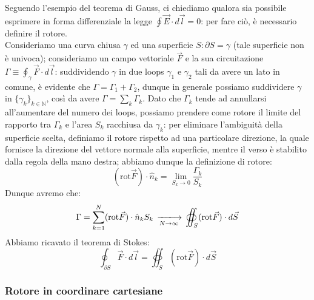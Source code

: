 Seguendo l'esempio del teorema di Gauss, ci chiediamo qualora sia possibile esprimere in forma differenziale la legge $ \oint \vec{E} \cdot d\vec{l} = 0 $: per fare ciò, è necessario definire il rotore. \\
%
Consideriamo una curva chiusa $ \gamma $ ed una superficie $ S : \partial S = \gamma $ (tale superficie non è univoca); consideriamo un campo vettoriale $ \vec{F} $ e la sua circuitazione $ \Gamma \equiv \oint_{\gamma} \vec{F} \cdot d\vec{l} $: suddividendo $ \gamma $ in due loops $ \gamma_1 $ e $ \gamma_2 $ tali da avere un lato in comune, è evidente che $ \Gamma = \Gamma_1 + \Gamma_2 $, dunque in generale possiamo suddividere $ \gamma $ in $ \{\gamma_k\}_{k\in\mathbb{N}} $, così da avere $ \Gamma = \sum_{k} \Gamma_k $. Dato che $ \Gamma_k $ tende ad annullarsi all'aumentare del numero dei loops, possiamo prendere come rotore il limite del rapporto tra $ \Gamma_k $ e l'area $ S_k $ racchiusa da $ \gamma_k $: per eliminare l'ambiguità della superficie scelta, definiamo il rotore rispetto ad una particolare direzione, la quale fornisce la direzione del vettore normale alla superficie, mentre il verso è stabilito dalla regola della mano destra; abbiamo dunque la definizione di rotore:
\begin{equation}
	( \text{rot} \vec{F} ) \cdot \hat{n}_k = \lim_{S_k \rightarrow 0} \frac{\Gamma_k}{S_k}
	\label{eq:}
\end{equation}
Dunque avremo che:
\begin{equation}
	\Gamma = \displaystyle\sum_{k = 1}^{N} ( \text{rot} \vec{F} ) \cdot \hat{n}_k S_k \,\xlongrightarrow[N \rightarrow \infty]{}\, \oiint_S ( \text{rot} \vec{F} ) \cdot d\vec{S}
	\label{eq:}
\end{equation}
Abbiamo ricavato il teorema di Stokes:
\begin{equation}
	\oint_{\partial S} \vec{F} \cdot d\vec{l} = \oiint_S ( \text{rot} \vec{F} ) \cdot d\vec{S}
	\label{eq:}
\end{equation}

\subsubsection{Rotore in coordinare cartesiane}

